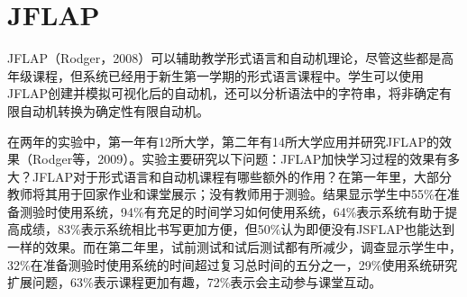 \section{JFLAP}
\begin{sectext}
JFLAP（Rodger，2008）可以辅助教学形式语言和自动机理论，尽管这些都是高年级课程，但系统已经用于新生第一学期的形式语言课程中。学生可以使用JFLAP创建并模拟可视化后的自动机，还可以分析语法中的字符串，将非确定有限自动机转换为确定性有限自动机。

在两年的实验中，第一年有12所大学，第二年有14所大学应用并研究JFLAP的效果（Rodger等，2009）。实验主要研究以下问题：JFLAP加快学习过程的效果有多大？JFLAP对于形式语言和自动机课程有哪些额外的作用？在第一年里，大部分教师将其用于回家作业和课堂展示；没有教师用于测验。结果显示学生中55\%在准备测验时使用系统，94\%有充足的时间学习如何使用系统，64\%表示系统有助于提高成绩，83\%表示系统相比书写更加方便，但50\%认为即便没有JSFLAP也能达到一样的效果。而在第二年里，试前测试和试后测试都有所减少，调查显示学生中，32\%在准备测验时使用系统的时间超过复习总时间的五分之一，29\%使用系统研究扩展问题，63\%表示课程更加有趣，72\%表示会主动参与课堂互动。
\end{sectext}
